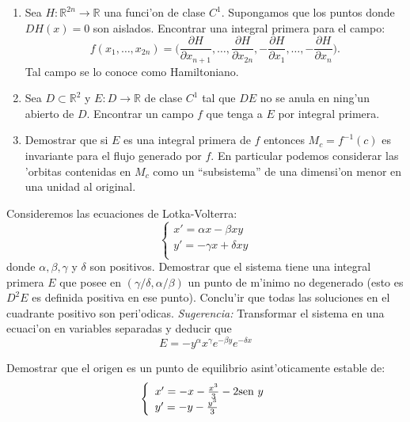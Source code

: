 \begin{ejercicio}{}
\begin{enumerate}
\item Sea $H:\mathbb{R}^{2n}\to\mathbb{R}$ una funci'on de clase
$C^1$. Supongamos que los puntos donde $DH(x)=0$ son aislados.
Encontrar una integral primera para el campo:
\[
    f(x_1,\ldots,x_{2n})= \bigg(\frac{\partial H}{\partial
    x_{n+1}},\ldots, \frac{\partial H}{\partial x_{2n}},
    -\frac{\partial H}{\partial x_{1}},\ldots,
    -\frac{\partial H}{\partial x_{n}} \bigg).
\]
Tal campo se lo conoce como Hamiltoniano.

\item Sea $D\subset\mathbb{R}^2$ y $E:D\to\mathbb{R}$  de clase
$C^1$ tal que $DE$ no se anula en ning'un abierto de $D$.
Encontrar un campo $f$ que tenga a $E$ por integral primera.


\item Demostrar que si $E$ es una integral primera de $f$ entonces
$M_c=f^{-1}(c)$ es invariante para el flujo generado por $f$. En
particular podemos considerar las 'orbitas contenidas en $M_c$
como un ``subsistema'' de una dimensi'on menor en una unidad al
original.



\end{enumerate}


\end{ejercicio}


\begin{ejercicio}{} Consideremos las ecuaciones de Lotka-Volterra:
\[
    \left\{%
\begin{array}{ll}
    x'=\alpha x-\beta x y\\
    y'=-\gamma x + \delta x y\\
\end{array}%
\right.
\]
donde $\alpha, \beta,\gamma$ y $ \delta$ son positivos. Demostrar
que el sistema tiene una integral primera $E$ que posee en
$(\gamma/\delta, \alpha/\beta)$
 un punto de m'inimo no degenerado (esto es $D^2E$ es definida
 positiva en ese punto). Conclu'ir que todas las soluciones en el
 cuadrante positivo son peri'odicas. \emph{Sugerencia:}
 Transformar el sistema en una ecuaci'on en variables separadas y
 deducir que
 \[
    E=-y^{\alpha}x^{\gamma}e^{-\beta y}e^{-\delta x}
 \]
\end{ejercicio}
\begin{ejercicio}{} Demostrar que el origen es un punto de
equilibrio asint'oticamente estable de:
\[
    \left\{%
\begin{array}{ll}
    x'=-x-\frac{x^3}{3}-2\hbox{sen }y \\
    y'=-y-\frac{y^3}{3}\\
\end{array}%
\right.
\]

\end{ejercicio}

